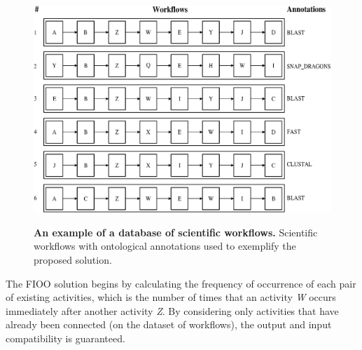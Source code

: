 \documentclass{doublecol-new}
\theoremstyle{TH}{
\newtheorem{lemma}{Lemma}
\newtheorem{theorem}[lemma]{Theorem}
\newtheorem{corrolary}[lemma]{Corrolary}
\newtheorem{conjecture}[lemma]{Conjecture}
\newtheorem{proposition}[lemma]{Proposition}
\newtheorem{claim}[lemma]{Claim}
\newtheorem{stheorem}[lemma]{Wrong Theorem}
\newtheorem{algorithm}{Algorithm}
}
\theoremstyle{THrm}{
\newtheorem{definition}{Definition}[section]
\newtheorem{question}{Question}[section]
\newtheorem{remark}{Remark}
\newtheorem{scheme}{Scheme}
}
\theoremstyle{THhit}{
\newtheorem{case}{Case}[section]
}
\begin{document}
\begin{figure}[!htb]
	\centering
	\caption{{\bf An example of a database of scientific workflows.} Scientific workflows with ontological annotations used to exemplify the proposed solution.}
	\includegraphics[scale = 0.3]{./pics/recomendacaofreqontologia.eps}
	\label{FIGURA_ONTOLOGIA_CONSTRUIDA2}
\end{figure}

The FIOO solution begins by calculating the frequency of occurrence of each pair of existing activities, which is the number of times that an activity \emph{W} occurs immediately after another activity \emph{Z}. By considering only activities that have already been connected (on the dataset of workflows), the output and input compatibility is guaranteed.
\end{document}

